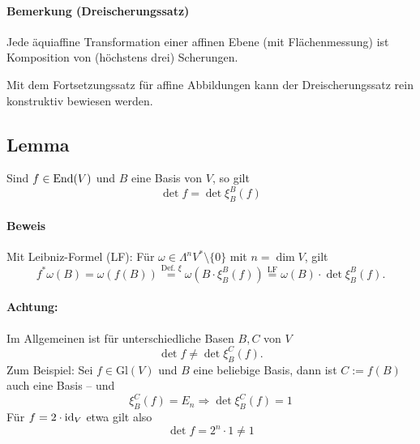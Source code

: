 \begin{figure}[H]
 		\end{figure}

 	\paragraph{Bemerkung (Dreischerungssatz)}
 		Jede äquiaffine Transformation einer affinen Ebene (mit Flächenmessung) ist Komposition von (höchstens drei) Scherungen.

 		Mit dem Fortsetzungssatz für affine Abbildungen kann der Dreischerungssatz rein konstruktiv bewiesen werden.
 \subsection{Lemma}
 	Sind $ f\in \operatorname{End}(V) $ und $ B $ eine Basis von $ V $, so gilt
 	\[
 		\det f = \det \xi_B^B(f)
 	\]
 	\paragraph{Beweis}
 		Mit Leibniz-Formel (LF): Für $ \omega\in \Lambda^nV^*\setminus\{0\} $ mit $ n=\dim V $, gilt
 		\[
 			f^*\omega(B) = \omega(f(B)) \overset{\text{Def. }\xi}{=} \omega(B\cdot \xi_B^B(f))
 			\overset{\text{LF}}{=} \omega(B)\cdot \det \xi_B^B(f).
 		\]
 	\paragraph{Achtung:}
 		Im Allgemeinen ist für unterschiedliche Basen $ B,C $ von $ V $
 		\[
 			\det f \neq \det \xi_B^C(f).
 		\]
 		Zum Beispiel: Sei $ f\in \mathrm{Gl}(V) $ und $ B $ eine beliebige Basis, dann ist $ C:=f(B) $ auch eine Basis -- und
 		\[
 			\xi_B^C(f) = E_n \Rightarrow \det \xi_B^C(f) = 1
 		\]
 		Für $ f=2\cdot \operatorname{id}_V $ etwa gilt also
 		\[
 			\det f = 2^n \cdot 1\neq 1
 		\]
